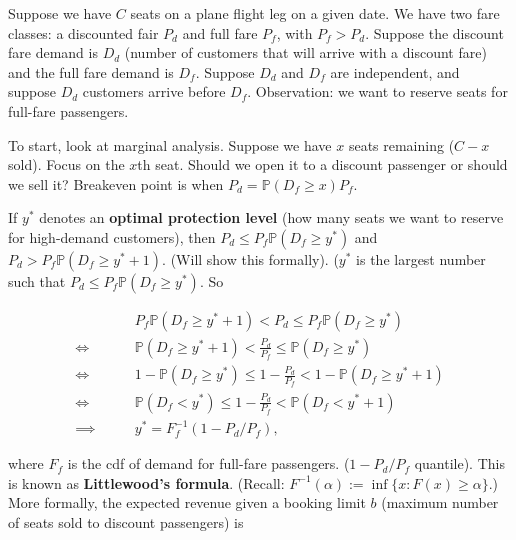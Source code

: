 \begin{example}\label{stoch.dp.two.class.littewood}

Suppose we have \(C\) seats on a plane flight leg on a given date. We have two fare classes: a discounted fair \(P_d\) and full fare \(P_f\), with \(P_f > P_d\). Suppose the discount fare demand is \(D_d\) (number of customers that will arrive with a discount fare) and the full fare demand is \(D_f\). Suppose \(D_d\) and \(D_f\) are independent, and suppose \(D_d\) customers arrive before \(D_f\). Observation: we want to reserve seats for full-fare passengers. 

To start, look at marginal analysis. Suppose we have \(x\) seats remaining (\(C-x\) sold). Focus on the \(x\)th seat. Should we open it to a discount passenger or should we sell it? Breakeven point is when \(P_d =  \mathbb{P}( D_f \geq x) P_f\).

If \(y^*\) denotes an \textbf{optimal protection level} (how many seats we want to reserve for high-demand customers), then \(P_d \leq P_f \mathbb{P}(D_f \geq y^*)\) and \(P_d > P_f \mathbb{P}(D_f \geq y^* + 1)\). (Will show this formally). (\(y^*\) is the largest number such that \(P_d \leq P_f \mathbb{P}(D_f \geq y^*)\). So

\begin{align*}
& P_f \mathbb{P}(D_f \geq y^* + 1) < P_d \leq P_f \mathbb{P}(D_f \geq y^*)
\\ \iff \qquad &  \mathbb{P}(D_f \geq y^* + 1) <  \frac{P_d}{P_f}  \leq \mathbb{P}(D_f \geq y^*)
\\ \iff \qquad & 1 -\mathbb{P}(D_f \geq y^*) \leq 1 - \frac{P_d}{P_f}  <  1 -  \mathbb{P}(D_f \geq y^* + 1)
\\ \iff \qquad & \mathbb{P}(D_f < y^*) \leq 1 - \frac{P_d}{P_f}  <   \mathbb{P}(D_f < y^* + 1)
\\ \implies \qquad & y^* = F_f^{-1}(1 - P_d/P_f),
\end{align*}

%

 where \(F_f\) is the cdf of demand for full-fare passengers. (\(1 - P_d/P_f\) quantile). This is known as \textbf{Littlewood's formula}. (Recall: \(F^{-1}(\alpha) := \inf\{x: F(x) \geq \alpha\}\).) More formally, the expected revenue given a booking limit \(b\) (maximum number of seats sold to discount passengers) is
 

\end{example}
